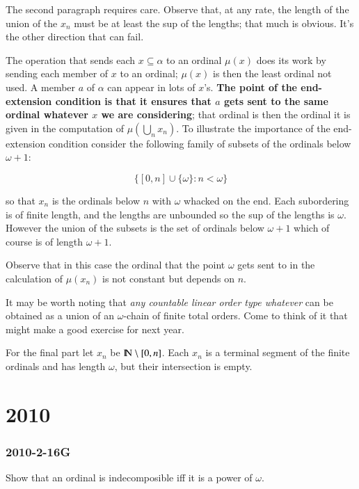 \documentclass{book}
\begin{document}
\medskip

The second paragraph requires care.  Observe that, at any rate, the
length of the union of the $x_n$ must be at least the sup of the
lengths; that much is obvious.  It's the other direction that can
fail.

The operation that sends each $x \subseteq \alpha$ to an ordinal
$\mu(x)$ does its work by sending each member of $x$ to an ordinal;
$\mu(x)$ is then the least ordinal not used.  A member $a$ of $\alpha$
can appear in lots of $x$'s. {\bf The point of the end-extension condition
is that it ensures that $a$ gets sent to the same ordinal whatever $x$
we are considering}; that ordinal is then the ordinal it is given in
the computation of $\mu(\bigcup_n x_n)$.  To illustrate the importance
of the end-extension condition consider the following family of
subsets of the ordinals below $\omega + 1$:

$$\{[0,n] \cup\{\omega\}: n < \omega\}$$

so that $x_n$ is the ordinals below $n$ with $\omega$ whacked on the
end.  Each subordering is of finite length, and the lengths are
unbounded so the sup of the lengths is $\omega$.  However the union of
the subsets is the set of ordinals below $\omega +1$ which of course
is of length $\omega + 1$.

Observe that in this case the ordinal that the point $\omega$ gets
sent to in the calculation of $\mu(x_n)$ is not constant but depends
on $n$.

It may be worth noting that {\sl any countable linear order type whatever}
can be obtained as a union of an $\omega$-chain of finite total orders.
Come to think of it that might make a good exercise for next year.


\smallskip

For the final part let $x_n$ be $\hbox{\rm I\negthinspace N} \setminus [0,n]$.  Each $x_n$ is
a terminal segment of the finite ordinals and has length $\omega$, but
their intersection is empty.

\chapter{2010}
\subsection*{2010-2-16G}

Show that an ordinal is indecomposible iff it is a power of $\omega$.

\smallskip
\end{document}
